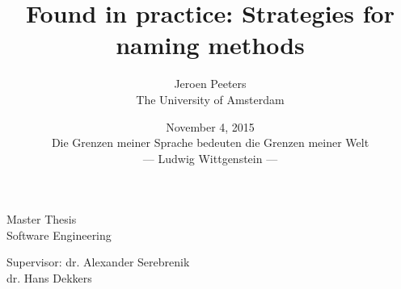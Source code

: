 \documentclass{article}%
\begin{document}
\title{Found in practice: Strategies for naming methods}
\author{Jeroen Peeters
\\The University of Amsterdam}
\date{November 4, 2015 \\\vspace*{12.5cm}\small{Die Grenzen meiner Sprache bedeuten die Grenzen meiner Welt\\--- Ludwig Wittgenstein ---}} %
\maketitle
\thispagestyle{empty}
\newpage

\begin{center}
Master Thesis \\
Software Engineering \\
\vspace{1cm}

\vspace{1cm}
Supervisor: dr. Alexander Serebrenik\\
\hspace{7 mm}dr. Hans Dekkers\\
\end{center}
\thispagestyle{empty}
\newpage


\renewcommand{\contentsname}{ \begin{center} --- Table of Contents --- \end{center}}
\setcounter{tocdepth}{1}
\tableofcontents
{}
\newpage







\newpage
{}


\appendix




\end{document}
